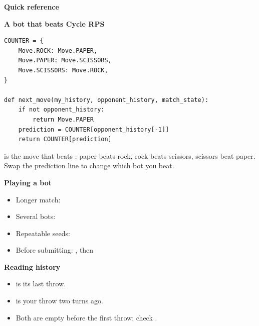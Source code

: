 \documentclass[11pt]{article}
\begin{document}
\vspace{8pt}
\begin{context}
{\large\bfseries Quick reference}\par\vspace{4pt}
\begingroup\small
\noindent\begin{minipage}[t]{.56\linewidth}\raggedright
\textbf{A bot that beats Cycle RPS}\par\vspace{-3pt}
\begin{lstlisting}[style=python,numbers=none,xleftmargin=4pt,framexleftmargin=0pt]
COUNTER = {
    Move.ROCK: Move.PAPER,
    Move.PAPER: Move.SCISSORS,
    Move.SCISSORS: Move.ROCK,
}

def next_move(my_history, opponent_history, match_state):
    if not opponent_history:
        return Move.PAPER
    prediction = COUNTER[opponent_history[-1]]
    return COUNTER[prediction]
\end{lstlisting}
 is the move that beats : paper beats rock, rock beats scissors, scissors beat paper. Swap the prediction line to change which bot you beat.
\end{minipage}\hfill
\begin{minipage}[t]{.40\linewidth}\raggedright
\textbf{Playing a bot}\par\vspace{2pt}
\par\vspace{2pt}
\begin{itemize}[leftmargin=1.2em,itemsep=1pt]
\item Longer match: 
\item Several bots: 
\item Repeatable seeds: 
\item Before submitting: , then 
\end{itemize}
\vspace{3pt}
\textbf{Reading history}\par\vspace{2pt}
\begin{itemize}[leftmargin=1.2em,itemsep=1pt]
\item {} is its last throw.
\item {} is your throw two turns ago.
\item Both are empty before the first throw: check .
\end{itemize}
\end{minipage}
\endgroup
\end{context}
\end{document}
